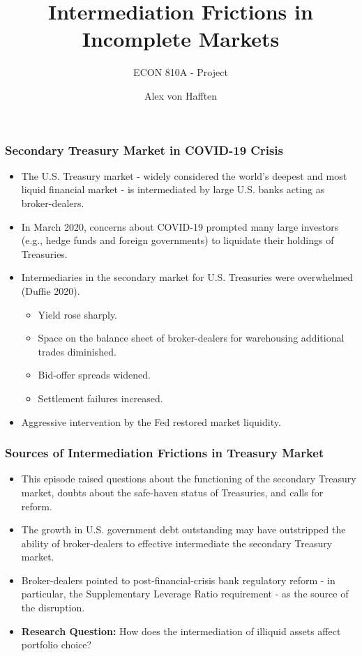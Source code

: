 \documentclass[handout]{beamer}
\title[Intermediation Frictions]{Intermediation Frictions in Incomplete Markets}
\subtitle{ECON 810A - Project}
\author{Alex von Hafften}
\institute{UW-Madison}
\begin{document}
\begin{frame}
\titlepage
\end{frame}

\begin{frame}
\frametitle{Secondary Treasury Market in COVID-19 Crisis}
\begin{itemize}[<+->]
\item The U.S. Treasury market - widely considered the world's deepest and most liquid financial market - is intermediated by large U.S. banks acting as broker-dealers.
\bigskip
\item In March 2020, concerns about COVID-19 prompted many large investors (e.g., hedge funds and foreign governments) to liquidate their holdings of Treasuries.
\bigskip
\item Intermediaries in the secondary market for U.S. Treasuries were overwhelmed (Duffie 2020).
\bigskip
\begin{itemize}[<+->]
\item Yield rose sharply.
\item Space on the balance sheet of broker-dealers for warehousing additional trades diminished.
\item Bid-offer spreads widened.
\item Settlement failures increased.
\end{itemize}
\bigskip
\item Aggressive intervention by the Fed restored market liquidity.
\end{itemize}
\end{frame}



\begin{frame}
\frametitle{Sources of Intermediation Frictions in Treasury Market}
\begin{itemize}[<+->]
\item This episode raised questions about the functioning of the secondary Treasury market, doubts about the safe-haven status of Treasuries, and calls for reform.
\bigskip
\item The growth in U.S. government debt outstanding may have outstripped the ability of broker-dealers to effective intermediate the secondary Treasury market.
\bigskip
\item Broker-dealers pointed to post-financial-crisis bank regulatory reform - in particular, the Supplementary Leverage Ratio requirement - as the source of the disruption.
\bigskip
\item \textbf{Research Question:} How does the intermediation of illiquid assets affect portfolio choice?
\end{itemize}
\end{frame}
\end{document}

